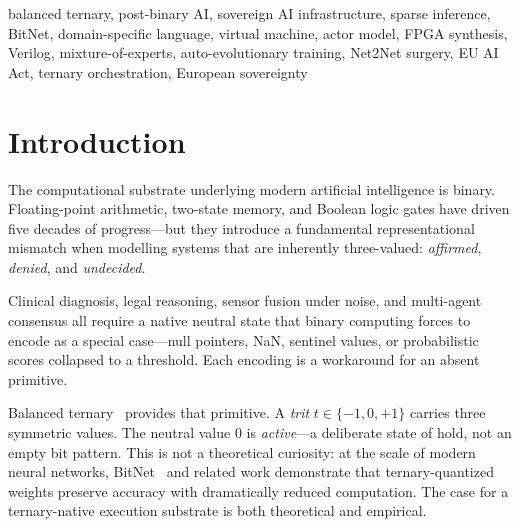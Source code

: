 \documentclass[journal,10pt,twocolumn]{IEEEtran}
\begin{document}
\begin{abstract}
The \textbf{MoE-13 v2.0 Orchestrator} scales to 1~Router and 12~Domain
Experts with Top-3 Sparse Routing and Asymmetric Safety Logic. The
\textbf{ternaudit-guard} crate maps ternary decision states directly
to EU AI Act Articles~13--15, providing the first language-native
regulatory compliance architecture for an AI execution substrate.

Beyond computation, TIS represents Europe's answer to the binary
hyperscaling paradigm: a complete, sovereign, open-core AI stack,
developed in Austria, licensed under LGPL and BSL, and designed to
operate without dependency on external proprietary AI infrastructure.
\end{abstract}

\begin{IEEEkeywords}
balanced ternary, post-binary AI, sovereign AI infrastructure, sparse
inference, BitNet, domain-specific language, virtual machine, actor model,
FPGA synthesis, Verilog, mixture-of-experts, auto-evolutionary training,
Net2Net surgery, EU AI Act, ternary orchestration, European sovereignty
\end{IEEEkeywords}

\section{Introduction}
\label{sec:intro}

The computational substrate underlying modern artificial intelligence is
binary. Floating-point arithmetic, two-state memory, and Boolean logic gates
have driven five decades of progress---but they introduce a fundamental
representational mismatch when modelling systems that are inherently
three-valued: \emph{affirmed}, \emph{denied}, and \emph{undecided}.

Clinical diagnosis, legal reasoning, sensor fusion under noise, and
multi-agent consensus all require a native neutral state that binary
computing forces to encode as a special case---null pointers, NaN, sentinel
values, or probabilistic scores collapsed to a threshold. Each encoding is a
workaround for an absent primitive.

Balanced ternary~\cite{knuth1997art} provides that primitive. A \emph{trit}
$t \in \{-1, 0, +1\}$ carries three symmetric values. The neutral value $0$
is \emph{active}---a deliberate state of hold, not an empty bit pattern.
This is not a theoretical curiosity: at the scale of modern neural networks,
BitNet~\cite{ma2024era} and related work demonstrate that ternary-quantized
weights preserve accuracy with dramatically reduced computation. The case for
a ternary-native execution substrate is both theoretical and empirical.
\end{document}

